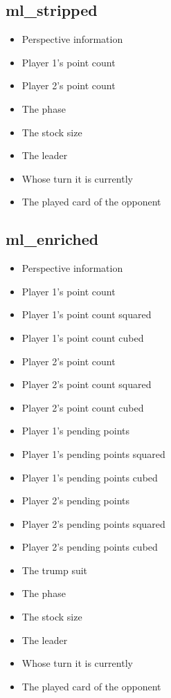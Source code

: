 \documentclass[a4paper,11pt]{article}
\begin{document}
\subsection{ml\_stripped}
\begin{itemize}
\item Perspective information
\item Player 1's point count
\item Player 2's point count
\item The phase
\item The stock size
\item The leader
\item Whose turn it is currently
\item The played card of the opponent
\end{itemize}
\subsection{ml\_enriched}
\begin{itemize}
\item Perspective information
\item Player 1's point count
\item Player 1's point count squared
\item Player 1's point count cubed
\item Player 2's point count
\item Player 2's point count squared
\item Player 2's point count cubed
\item Player 1's pending points
\item Player 1's pending points squared
\item Player 1's pending points cubed
\item Player 2's pending points
\item Player 2's pending points squared
\item Player 2's pending points cubed
\item The trump suit
\item The phase
\item The stock size
\item The leader
\item Whose turn it is currently
\item The played card of the opponent
\end{itemize}
\end{document}
